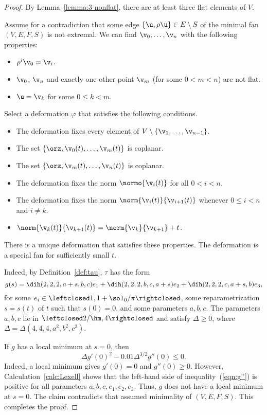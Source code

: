 \begin{proof} 
By Lemma~\ref{lemma:3-nonflat}, there are at least three flat
elements of $V$.

Assume for a contradiction that some edge $\{\u,\rho\u\}\in
E\setminus S$ of the minimal fan $(V,E,F,S)$ is not extremal.  
We can find $\v_0,\ldots,\v_n$ with the following properties:
\begin{itemize}
\item $\rho^i\v_0 =\v_i$.
\item $\v_0$, $\v_n$ and exactly one other point $\v_m$ (for some $0<m<n$) are not flat.  
\item $\u=\v_k$ for some $0\le k<m$.
\end{itemize}

Select a deformation $\varphi$ that satisfies the following conditions.
\begin{itemize}
\item The deformation fixes every element of
$V\setminus\{\v_1,\ldots,\v_{n-1}\}$.
\item The set $\{\orz,\v_0(t),\ldots,\v_m(t)\}$ is coplanar.
\item The set $\{\orz,\v_m(t),\ldots,\v_n(t)\}$ is coplanar.
\item The deformation  fixes the norm $\normo{\v_i(t)}$ for all $0<i<n$.
\item The deformation fixes the norm $\norm{\v_i(t)}{\v_{i+1}(t)}$ whenever $0\le i<n$ and $i\ne k$.
\item $\norm{\v_k(t)}{\v_{k+1}(t)} = \norm{\v_k}{\v_{k+1}}+t$.
\end{itemize}
There is a unique deformation that satisfies these properties.  The
deformation is a special fan for sufficiently small $t$.

  Indeed, by Definition~\ref{def:tau},
$\tau$ has the form
\begin{displaymath}
  g(s) = \dih(2,2,2,a+s,b,c) e_1 
+ \dih(2,2,2,b,c,a+s) e_2 + \dih(2,2,2,c,a+s,b) e_3,
\end{displaymath}
for some $e_i\in\leftclosed1,1+\sol_0/\pi\rightclosed$, some
reparametrization $s=s(t)$ of $t$ such that $s(0)=0$, and some
parameters $a,b,c$.  The parameters $a,b,c$ lie in
$\leftclosed2/\hm,4\rightclosed$ and satisfy $\Delta\ge0$, where
$\Delta = \Delta(4,4,4,a^2,b^2,c^2)$.

If $g$ has a local minimum at $s=0$, then
\begin{equation}\label{eqn:g''}
\Delta g'(0)^2 - 0.01\Delta^{3/2} g''(0) \le 0.
\end{equation}
Indeed, a local minimum gives $g'(0)=0$ and $g''(0)\ge0$.
However, Calculation~\ref{calc:Lexell} shows that the
left-hand side of inequality~(\ref{eqn:g''}) is positive for all
parameters $a,b,c,e_1,e_2,e_3$.  Thus, $g$ does not have a  local minimum at $s=0$.
The claim contradicts that assumed minimality of $(V,E,F,S)$.  This
completes the proof.
\end{proof}


